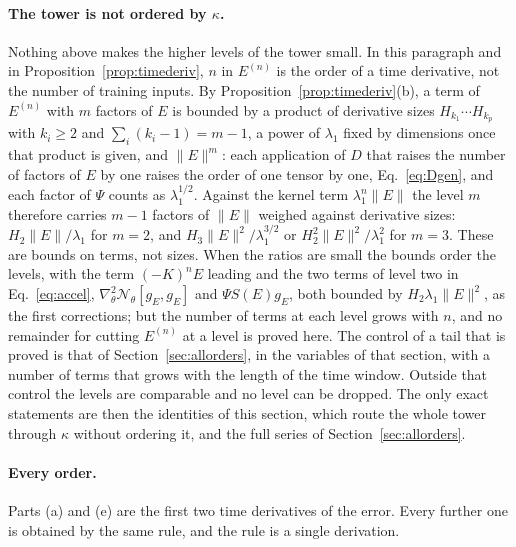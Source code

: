 \documentclass[11pt]{article}
\theoremstyle{definition}
\theoremstyle{remark}
\newcommand{\Net}{\mathcal{N}_\theta}    %
\begin{document}
\paragraph{The tower is not ordered by $\kappa$.}
Nothing above makes the higher levels of the tower small.
In this paragraph and in Proposition~\ref{prop:timederiv}, $n$ in $E^{(n)}$ is the order of a time derivative, not the number of training inputs.
By Proposition~\ref{prop:timederiv}(b), a term of $E^{(n)}$ with $m$ factors of $E$ is bounded by a product of derivative sizes $H_{k_1}\cdots H_{k_p}$ with $k_i\ge2$ and $\sum_i(k_i - 1) = m - 1$, a power of $\lambda_1$ fixed by dimensions once that product is given, and $\|E\|^m$: each application of $D$ that raises the number of factors of $E$ by one raises the order of one tensor by one, Eq.~\eqref{eq:Dgen}, and each factor of $\Psi$ counts as $\lambda_1^{1/2}$.
Against the kernel term $\lambda_1^n\|E\|$ the level $m$ therefore carries $m - 1$ factors of $\|E\|$ weighed against derivative sizes: $H_2\|E\|/\lambda_1$ for $m = 2$, and $H_3\|E\|^2/\lambda_1^{3/2}$ or $H_2^2\|E\|^2/\lambda_1^2$ for $m = 3$.
These are bounds on terms, not sizes.
When the ratios are small the bounds order the levels, with the term $(-K)^nE$ leading and the two terms of level two in Eq.~\eqref{eq:accel}, $\nabla^2_\theta\Net[g_E,g_E]$ and $\Psi S(E)g_E$, both bounded by $H_2\lambda_1\|E\|^2$, as the first corrections; but the number of terms at each level grows with $n$, and no remainder for cutting $E^{(n)}$ at a level is proved here.
The control of a tail that is proved is that of Section~\ref{sec:allorders}, in the variables of that section, with a number of terms that grows with the length of the time window.
Outside that control the levels are comparable and no level can be dropped.
The only exact statements are then the identities of this section, which route the whole tower through $\kappa$ without ordering it, and the full series of Section~\ref{sec:allorders}.

\paragraph{Every order.}
Parts (a) and (e) are the first two time derivatives of the error.
Every further one is obtained by the same rule, and the rule is a single derivation.
\end{document}
